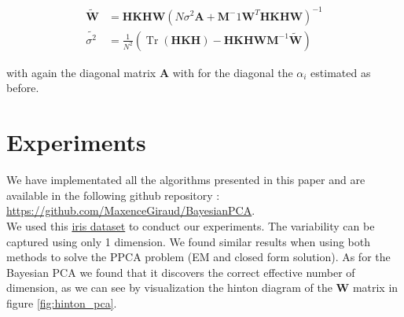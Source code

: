 \documentclass{article}
\begin{document}
\begin{equation}
    \begin{aligned}
        \widetilde{ \mathbf{W}} &= \mathbf{H} \mathbf{K} \mathbf{H} \mathbf{W} (N \sigma^2 \mathbf{A} + \mathbf{M}^-1 \mathbf{W}^T \mathbf{H} \mathbf{K} \mathbf{H} \mathbf{W} )^{-1} \\
        \widetilde{ \sigma^2 } &= \frac{1}{N^2} ( \operatorname{Tr}(\mathbf{H} \mathbf{K} \mathbf{H}) - \mathbf{H} \mathbf{K} \mathbf{H} \mathbf{W} \mathbf{M}^{-1} \widetilde{ \mathbf{W}} )
    \end{aligned}
    \label{em_pkpca}
\end{equation}

with again the diagonal matrix $\mathbf{A}$ with for the diagonal the $\alpha_i$ estimated as before.

\section{Experiments}

We have implementated all the algorithms presented in this paper and are available in the following github repository : \url{https://github.com/MaxenceGiraud/BayesianPCA}. \\

We used this \href{https://archive.ics.uci.edu/ml/datasets/Iris/}{iris dataset} to conduct our experiments. The variability can be captured using only 1 dimension. We found similar results when using both methods to solve the PPCA problem (EM and closed form solution). As for the Bayesian PCA we found that it discovers the  correct effective number of dimension, as we can see by visualization the hinton diagram of the $\mathbf{W}$ matrix in figure \ref{fig:hinton_pca}.\\
\end{document}
